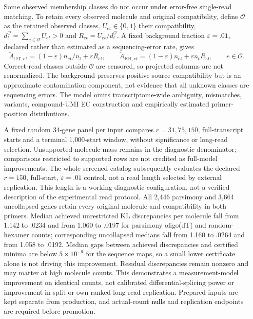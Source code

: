 \documentclass[11pt]{article}
\begin{document}
Some observed membership classes do not occur under error-free single-read matching. To retain every observed molecule and original compatibility, define \(\mathcal O\) as the retained observed classes, \(U_{et}\in\{0,1\}\) their compatibility, \(d_t^{\mathcal O}=\sum_{e\in\mathcal O}U_{et}>0\) and \(R_{et}=U_{et}/d_t^{\mathcal O}\). A fixed background fraction \(\varepsilon=.01\), declared rather than estimated as a sequencing-error rate, gives \begin{equation}\widetilde A_{\mathrm{DT},et}=(1-\varepsilon)n_{et}/n_t+\varepsilon R_{et},\qquad \widetilde A_{\mathrm{RH},et}=(1-\varepsilon)n_{et}+\varepsilon n_tR_{et},\qquad e\in\mathcal O.\end{equation} Correct-read classes outside \(\mathcal O\) are censored, so projected columns are not renormalized. The background preserves positive source compatibility but is an approximate contamination component, not evidence that all unknown classes are sequencing errors. The model omits transcriptome-wide ambiguity, mismatches, variants, compound-UMI EC construction and empirically estimated primer-position distributions.

A fixed random 34-gene panel per input compares \(r=31,75,150\), full-transcript starts and a terminal 1,000-start window, without significance or long-read selection. Unsupported molecule mass remains in the diagnostic denominator; comparisons restricted to supported rows are not credited as full-model improvements. The whole screened catalog subsequently evaluates the declared \(r=150\), full-start, \(\varepsilon=.01\) control, not a read length selected by external replication. This length is a working diagnostic configuration, not a verified description of the experimental read protocol. All 2,446 parsimony and 3,664 uncollapsed genes retain every original molecule and compatibility in both primers. Median achieved unrestricted KL discrepancies per molecule fall from 1.142 to .0234 and from 1.060 to .0197 for parsimony oligo(dT) and random-hexamer counts; corresponding uncollapsed medians fall from 1.160 to .0264 and from 1.058 to .0192. Median gaps between achieved discrepancies and certified minima are below \(5\times10^{-6}\) for the sequence maps, so a small lower certificate alone is not driving this improvement. Residual discrepancies remain nonzero and may matter at high molecule counts. This demonstrates a measurement-model improvement on identical counts, not calibrated differential-splicing power or improvement in split or own-ranked long-read replication. Prepared inputs are kept separate from production, and actual-count nulls and replication endpoints are required before promotion.
\end{document}
